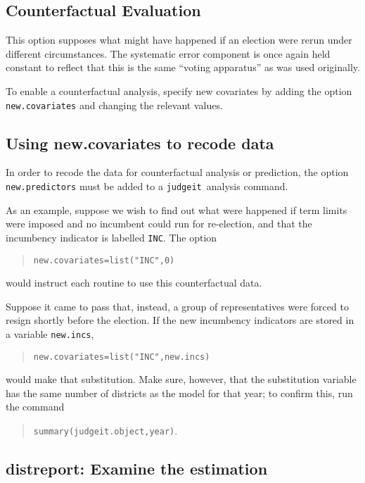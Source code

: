 \documentclass[oneside,letterpaper,titlepage]{article}
\newcommand{\jud}{\texttt{judgeit}\ }
\begin{document}
\subsection{Counterfactual Evaluation}

This option supposes what might have happened if an election were
rerun under different circumstances. The systematic error component
is once again held constant to reflect that this is the same
``voting apparatus'' as was used originally.

To enable a counterfactual analysis, specify new covariates by
adding the option \texttt{new.covariates} and changing the relevant values.

\subsection{Using new.covariates to recode data}

In order to recode the data for counterfactual analysis or
prediction, the option \texttt{new.predictors} must be added to a
\jud analysis command.

As an example, suppose we wish to find out what were happened if term
limits were imposed and no incumbent could run for re-election, and
that the incumbency indicator is labelled \texttt{INC}. The option

\begin{quote} \texttt{new.covariates=list("INC",0)} \end{quote}

would instruct each routine to use this counterfactual data.

Suppose it came to pass that, instead, a group of representatives were
forced to resign shortly before the election. If the new incumbency
indicators are stored in a variable \texttt{new.incs},

\begin{quote} \texttt{new.covariates=list("INC",new.incs)} \end{quote}

would make that substitution. Make sure, however, that the
substitution variable has the same number of districts as the model
for that year; to confirm this, run the command

\begin{quote} \texttt{summary(judgeit.object,year)}. \end{quote}

\subsection{distreport: Examine the estimation}
\end{document}
